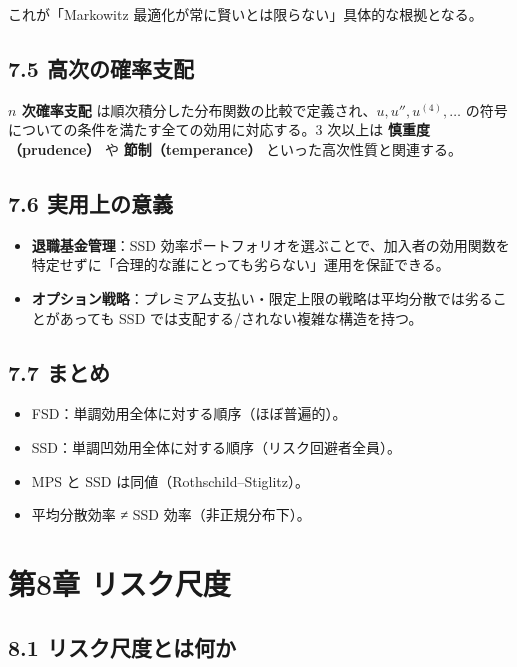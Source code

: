 \documentclass[11pt,a4paper]{report}
\begin{document}
これが「Markowitz 最適化が常に賢いとは限らない」具体的な根拠となる。

\section{7.5 高次の確率支配}

\textbf{$n$ 次確率支配} は順次積分した分布関数の比較で定義され、$u, u'', u^{(4)}, \dots$ の符号についての条件を満たす全ての効用に対応する。3 次以上は \textbf{慎重度（prudence）} や \textbf{節制（temperance）} といった高次性質と関連する。

\section{7.6 実用上の意義}

\begin{itemize}
\item \textbf{退職基金管理}：SSD 効率ポートフォリオを選ぶことで、加入者の効用関数を特定せずに「合理的な誰にとっても劣らない」運用を保証できる。
\item \textbf{オプション戦略}：プレミアム支払い・限定上限の戦略は平均分散では劣ることがあっても SSD では支配する/されない複雑な構造を持つ。
\end{itemize}

\section{7.7 まとめ}

\begin{itemize}
\item FSD：単調効用全体に対する順序（ほぼ普遍的）。
\item SSD：単調凹効用全体に対する順序（リスク回避者全員）。
\item MPS と SSD は同値（Rothschild–Stiglitz）。
\item 平均分散効率 ≠ SSD 効率（非正規分布下）。
\end{itemize}

\noindent\hrulefill

\chapter{第8章 リスク尺度}

\section{8.1 リスク尺度とは何か}
\end{document}
